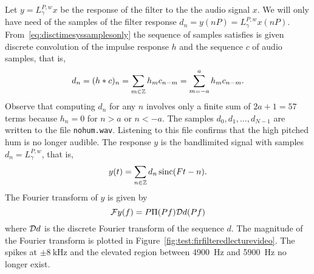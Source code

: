 \begin{test}
Let $y = L_\gamma^{P,w} x$ be the response of the filter to the the audio signal $x$.  We will only have need of the samples of the filter response $d_n = y(nP) = L_\gamma^{P,w} x(nP)$.  From~\eqref{eq:disctimesyssamplesonly} the sequence of samples satisfies is given discrete convolution of the impulse response $h$ and the sequence $c$ of audio samples, that is, 
\[
d_n = (h*c)_n = \sum_{m \in {\mathbb Z}} h_m c_{n-m} = \sum_{m = -a}^a h_m c_{n-m}.
\]
Observe that computing $d_n$ for any $n$ involves only a finite sum of $2a+1 = 57$ terms because $h_n = 0$ for $n > a$ or $n < -a$.  The samples $d_0, d_1, \dots, d_{N-1}$ are written to the file \texttt{nohum.wav}.  Listening to this file confirms that the high pitched hum is no longer audible.  The response $y$ is the bandlimited signal with samples $d_n = L_\gamma^{P,w}$, that is, 
\[
y(t) = \sum_{n \in {\mathbb Z}} d_n \operatorname{sinc}(Ft - n).
\]  
The Fourier transform of $y$ is given by
\[
{\mathcal F} y(f) = P \Pi(Pf) {\mathcal D} d(Pf)
\]
where ${\mathcal D} d$ is the discrete Fourier transform of the sequence $d$.  The magnitude of the Fourier transform is plotted in Figure~\ref{fig:test:firfilteredlecturevideo}.  The spikes at $\pm\SI{8}{\kilo\hertz}$ and the elevated region between \SI{4900}{\hertz} and \SI{5900}{\hertz} no longer exist.

\end{test}

